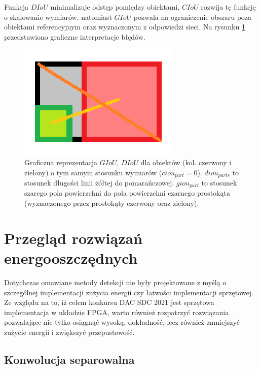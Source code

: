 Funkcja $DIoU$ minimalizuje odstęp pomiędzy obiektami, $CIoU$ rozwija tę funkcję o skalowanie wymiarów, natomiast $GIoU$ pozwala na ograniczenie obszaru poza obiektami referencyjnym oraz wyznaczonym z odpowiedzi sieci.
Na rysunku \ref{fig:iou_losses} przedstawiono graficzne interpretacje błędów.


\begin{figure}
    \centering
     \includegraphics[width=0.4\linewidth]{images/gcdiou.png}
    \caption{ Graficzna reprezentacja $GIoU$, $DIoU$ dla obiektów (kol. czerwony i zielony) o tym samym stosunku wymiarów ($ciou_{part} = 0$). $diou_{parts}$ to stosunek długości linii żółtej do pomarańczowej. $giou_{part}$ to stosunek szarego pola powierzchni do pola powierzchni czarnego prostokąta (wyznaczonego przez prostokąty czerwony oraz zielony).}
    \label{fig:iou_losses}
\end{figure}

\section{Przegląd rozwiązań energooszczędnych}

Dotychczas omawiane metody detekcji nie były projektowane z myślą o szczególnej implementacji zużycia energii czy łatwości implementacji sprzętowej. 
Ze względu na to, iż celem konkursu DAC SDC 2021 jest sprzętowa implementacja w układzie FPGA, warto również rozpatrzyć rozwiązania pozwalające nie tylko osiągnąć wysoką, dokładność, lecz również zmniejszyć zużycie energii i zwiększyć przepustowość.

\subsection{Konwolucja separowalna}
\label{subsec:sep_conv}

